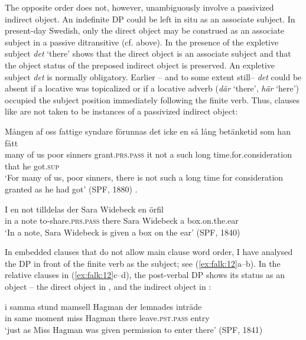 \documentclass[output=paper]{langscibook}
\begin{document}
The opposite order does not, however, unambiguously involve a passivized indirect object. An indefinite DP could be left in situ as an associate subject. In present-day Swedish, only the direct object may be construed as an associate subject in a passive ditransitive (cf.  above). In  the presence of {the expletive subject \textit{det} ‘there’} shows that the direct object is an associate subject and that the object status of the preposed indirect object is preserved. An expletive subject \textit{det} is normally obligatory. Earlier – and to some extent still– \textit{det} could be absent if a locative was topicalized or if a locative adverb (\textit{där} ‘there’, \textit{här} ‘here’) occupied the subject position immediately following the finite verb. Thus, clauses like  are not taken to be instances of a passivized indirect object:

\ea%
    \label{ex:falk:11}
\ea\label{ex:falk:11a}
\gll Mången  af  oss  fattige  syndare  förunnas      det  icke  en  så    lång  betänketid            som  han  fått\\
many    of  us    poor    sinners    grant\textsc{.prs}.\textsc{pass}     it    not  a  such  long      time.for.consideration  that  he    got\textsc{.sup}\footnotemark{}\\
\glt ‘For many of us, poor sinners, there is not such a long time for consideration granted as he had got’ (SPF, 1880)
.

\ex\label{ex:falk:11b}
\gll I  en  not  tilldelas            der  Sara  Widebeck  en  örfil\\
      in  a  note  to-share\textsc{.prs}.\textsc{pass}    there  Sara  Widebeck  a  box.on.the.ear\\
\glt ‘In a note, Sara Widebeck is given a box on the ear’ (SPF, 1840)
\z
\z


In embedded clauses that do not allow main clause word order, I have analysed the DP in front of the finite verb as the subject; see (\ref{ex:falk:12}a–b). In the relative clauses in (\ref{ex:falk:12}c–d), the post-verbal DP shows its status as an object – the direct object in , and the indirect object in :

\ea%
    \label{ex:falk:12}
\ea\label{ex:falk:12a}
\gll i  samma  stund    mamsell  Hagman  der    lemnades      inträde\\
      in  same    moment miss    Hagman  there  leave\textsc{.pst}.\textsc{pass}     entry\\
\glt ‘just as Miss Hagman was given permission to enter there’ (SPF, 1841)
\end{document}
